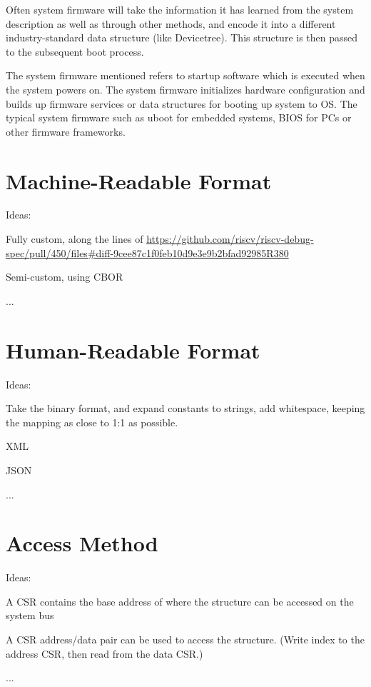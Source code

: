Often system firmware will take the information it has learned from the system
description as well as through other methods, and encode it into a different
industry-standard data structure (like Devicetree).  This structure is then
passed to the subsequent boot process.

\begin{commentary}
The system firmware mentioned refers to startup software which is executed
when the system powers on. The system firmware initializes hardware configuration and
builds up firmware services or data structures for booting up system to OS. The typical
system firmware such as uboot for embedded systems, BIOS for PCs or other firmware
frameworks.
\end{commentary}

\chapter{Machine-Readable Format}

\begin{steps}{Ideas:}
\item Fully custom, along the lines of
    \url{https://github.com/riscv/riscv-debug-spec/pull/450/files#diff-9cee87c1f0feb10d9e3e9b2bfad92985R380}
\item Semi-custom, using CBOR
\item ...
\end{steps}

\chapter{Human-Readable Format}

\begin{steps}{Ideas:}
\item Take the binary format, and expand constants to strings, add whitespace,
keeping the mapping as close to 1:1 as possible.
\item XML
\item JSON
\item ...
\end{steps}

\chapter{Access Method}
\label{sec:AccessMethod}

\begin{steps}{Ideas:}
\item A CSR contains the base address of where the structure can be accessed on
the system bus
\item A CSR address/data pair can be used to access the structure. (Write index
to the address CSR, then read from the data CSR.)
\item ...
\end{steps}
